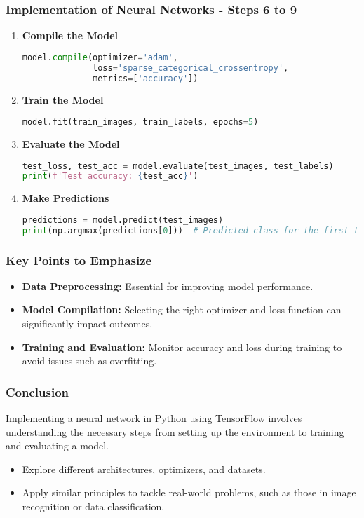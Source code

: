\documentclass[aspectratio=169]{beamer}
\begin{document}
\begin{frame}[fragile]
    \frametitle{Implementation of Neural Networks - Steps 6 to 9}
    \begin{enumerate}[start=6]
        \item \textbf{Compile the Model}
            \begin{lstlisting}[language=Python]
model.compile(optimizer='adam',
              loss='sparse_categorical_crossentropy',
              metrics=['accuracy'])
            \end{lstlisting}
        \item \textbf{Train the Model}
            \begin{lstlisting}[language=Python]
model.fit(train_images, train_labels, epochs=5)
            \end{lstlisting}
        \item \textbf{Evaluate the Model}
            \begin{lstlisting}[language=Python]
test_loss, test_acc = model.evaluate(test_images, test_labels)
print(f'Test accuracy: {test_acc}')
            \end{lstlisting}
        \item \textbf{Make Predictions}
            \begin{lstlisting}[language=Python]
predictions = model.predict(test_images)
print(np.argmax(predictions[0]))  # Predicted class for the first test image
            \end{lstlisting}
    \end{enumerate}
\end{frame}

\begin{frame}[fragile]
    \frametitle{Key Points to Emphasize}
    \begin{itemize}
        \item \textbf{Data Preprocessing:} Essential for improving model performance.
        \item \textbf{Model Compilation:} Selecting the right optimizer and loss function can significantly impact outcomes.
        \item \textbf{Training and Evaluation:} Monitor accuracy and loss during training to avoid issues such as overfitting.
    \end{itemize}
\end{frame}

\begin{frame}[fragile]
    \frametitle{Conclusion}
    Implementing a neural network in Python using TensorFlow involves understanding the necessary steps from setting up the environment to training and evaluating a model. 
    \begin{itemize}
        \item Explore different architectures, optimizers, and datasets.
        \item Apply similar principles to tackle real-world problems, such as those in image recognition or data classification.
    \end{itemize}
\end{frame}
\end{document}
